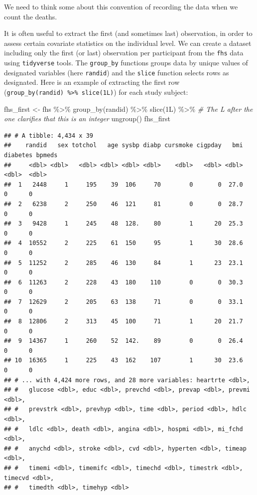 \documentclass[
]{book}
\newenvironment{Shaded}{\begin{snugshade}}{\end{snugshade}}
\newcommand{\CommentTok}[1]{\textcolor[rgb]{0.56,0.35,0.01}{\textit{#1}}}
\newcommand{\FunctionTok}[1]{\textcolor[rgb]{0.00,0.00,0.00}{#1}}
\newcommand{\NormalTok}[1]{#1}
\newcommand{\OtherTok}[1]{\textcolor[rgb]{0.56,0.35,0.01}{#1}}
\newcommand{\SpecialCharTok}[1]{\textcolor[rgb]{0.00,0.00,0.00}{#1}}
\begin{document}
We need to think some about this convention of recording the data when we count
the deaths.

It is often useful to extract the first (and sometimes last) observation, in order to assess certain covariate statistics on the individual level. We can create a dataset including only the first (or last) observation per participant from the \texttt{fhs} data using \texttt{tidyverse} tools. The \texttt{group\_by} functions groups data by unique values of designated variables (here \texttt{randid}) and the \texttt{slice} function selects rows as designated. Here is an example of extracting the first row (\texttt{group\_by(randid)\ \%\textgreater{}\%\ slice(1L)}) for each study subject:

\begin{Shaded}
\begin{Highlighting}[]
\NormalTok{fhs\_first }\OtherTok{\textless{}{-}}\NormalTok{ fhs }\SpecialCharTok{\%\textgreater{}\%} 
  \FunctionTok{group\_by}\NormalTok{(randid) }\SpecialCharTok{\%\textgreater{}\%} 
  \FunctionTok{slice}\NormalTok{(1L) }\SpecialCharTok{\%\textgreater{}\%} \CommentTok{\# The L after the one clarifies that this is an integer}
  \FunctionTok{ungroup}\NormalTok{()}
\NormalTok{fhs\_first}
\end{Highlighting}
\end{Shaded}

\begin{verbatim}
## # A tibble: 4,434 x 39
##    randid   sex totchol   age sysbp diabp cursmoke cigpday   bmi diabetes bpmeds
##     <dbl> <dbl>   <dbl> <dbl> <dbl> <dbl>    <dbl>   <dbl> <dbl>    <dbl>  <dbl>
##  1   2448     1     195    39  106     70        0       0  27.0        0      0
##  2   6238     2     250    46  121     81        0       0  28.7        0      0
##  3   9428     1     245    48  128.    80        1      20  25.3        0      0
##  4  10552     2     225    61  150     95        1      30  28.6        0      0
##  5  11252     2     285    46  130     84        1      23  23.1        0      0
##  6  11263     2     228    43  180    110        0       0  30.3        0      0
##  7  12629     2     205    63  138     71        0       0  33.1        0      0
##  8  12806     2     313    45  100     71        1      20  21.7        0      0
##  9  14367     1     260    52  142.    89        0       0  26.4        0      0
## 10  16365     1     225    43  162    107        1      30  23.6        0      0
## # ... with 4,424 more rows, and 28 more variables: heartrte <dbl>,
## #   glucose <dbl>, educ <dbl>, prevchd <dbl>, prevap <dbl>, prevmi <dbl>,
## #   prevstrk <dbl>, prevhyp <dbl>, time <dbl>, period <dbl>, hdlc <dbl>,
## #   ldlc <dbl>, death <dbl>, angina <dbl>, hospmi <dbl>, mi_fchd <dbl>,
## #   anychd <dbl>, stroke <dbl>, cvd <dbl>, hyperten <dbl>, timeap <dbl>,
## #   timemi <dbl>, timemifc <dbl>, timechd <dbl>, timestrk <dbl>, timecvd <dbl>,
## #   timedth <dbl>, timehyp <dbl>
\end{verbatim}
\end{document}
